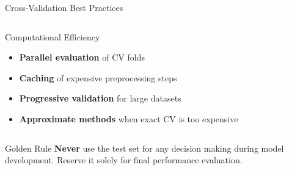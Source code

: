 \documentclass[8pt,aspectratio=1610]{beamer}
\begin{document}
\begin{frame}{Cross-Validation Best Practices}
\begin{columns}[t]
\begin{column}{0.48\textwidth}
\begin{block}{Computational Efficiency}
\begin{itemize}
\setlength{\itemsep}{3pt}
\item \textbf{Parallel evaluation} of CV folds
\item \textbf{Caching} of expensive preprocessing steps
\item \textbf{Progressive validation} for large datasets
\item \textbf{Approximate methods} when exact CV is too expensive
\end{itemize}
\end{block}
\end{column}
\end{columns}

\begin{alertblock}{Golden Rule}
\textbf{Never} use the test set for any decision making during model development. Reserve it solely for final performance evaluation.
\end{alertblock}
\end{frame}
\end{document}
